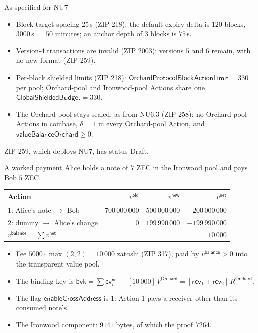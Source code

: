 \documentclass[aspectratio=169,11pt]{beamer}
\newcommand{\cvsym}{\ensuremath{\mathsf{cv}}}
\newcommand{\rcv}{\ensuremath{\mathsf{rcv}}}
\newcommand{\VO}{V^{\mathsf{Orchard}}}
\newcommand{\RO}{R^{\mathsf{Orchard}}}
\newcommand{\vnet}{v^{\mathsf{net}}}
\newcommand{\cvnet}{\cvsym^{\mathsf{net}}}
\newcommand{\vb}{v^{\mathsf{balance}}}
\newcommand{\old}{^{\mathsf{old}}}
\newcommand{\new}{^{\mathsf{new}}}
\begin{document}
\begin{frame}{As specified for NU7}
\begin{itemize}\itemsep6pt
\item Block target spacing $25$\,s (ZIP 218); the default expiry delta is
  $120$ blocks, $3000$\,s $= 50$ minutes; an anchor depth of $3$ blocks is
  $75$\,s.
\item Version-$4$ transactions are invalid (ZIP 2003); versions $5$ and $6$
  remain, with no new format (ZIP 259).
\item Per-block shielded limits (ZIP 218):
  $\mathsf{OrchardProtocolBlockActionLimit} = 330$ per pool; Orchard-pool and
  Ironwood-pool Actions share one $\mathsf{GlobalShieldedBudget} = 330$.
\item The Orchard pool stays sealed, as from NU6.3 (ZIP 258): no
  Orchard-pool Actions in coinbase, $\delta = 1$ in every Orchard-pool
  Action, and $\mathsf{valueBalanceOrchard} \ge 0$.
\end{itemize}
\vfill
ZIP 259, which deploys NU7, has status Draft.
\end{frame}

\begin{frame}{A worked payment}
\small
Alice holds a note of $7$ ZEC in the Ironwood pool and pays Bob $5$ ZEC.
\begin{center}
\begin{tabular}{@{}lrrr@{}}
\toprule
Action & $v\old$ & $v\new$ & $\vnet$ \\
\midrule
1: Alice's note $\to$ Bob & $700\,000\,000$ & $500\,000\,000$ & $200\,000\,000$ \\
2: dummy $\to$ Alice's change & $0$ & $199\,990\,000$ & $-199\,990\,000$ \\
\midrule
$\vb = \sum \vnet$ & & & $10\,000$ \\
\bottomrule
\end{tabular}
\end{center}
\begin{itemize}\itemsep3pt
\item Fee $5000 \cdot \max(2, 2) = 10\,000$ zatoshi (ZIP 317), paid by $\vb > 0$
  into the transparent value pool.
\item The binding key is $\mathsf{bvk} = \sum \cvnet_i - [10\,000]\,\VO = [\rcv_1 + \rcv_2]\,\RO$.
\item The flag $\mathsf{enableCrossAddress}$ is $1$: Action 1 pays a receiver other than
  its consumed note's.
\item The Ironwood component: $9141$ bytes, of which the proof $7264$.
\end{itemize}
\end{frame}
\end{document}
